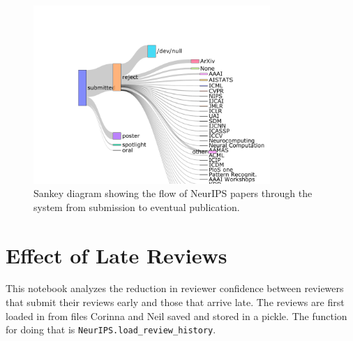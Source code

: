 \begin{figure}[htb]
\includegraphics[width=0.80\textwidth]{diagrams/neurips/where-do-neurips-papers-go.pdf}


\caption{Sankey diagram showing the flow of NeurIPS papers through the system from submission to eventual publication.}
\label{where-do-neurips-papers-go}
\end{figure}

\hypertarget{effect-of-late-reviews}{%
\section{Effect of Late Reviews}\label{effect-of-late-reviews}}

\begin{flushright}
\end{flushright}

This notebook analyzes the reduction in reviewer confidence between
reviewers that submit their reviews early and those that arrive late.
The reviews are first loaded in from files Corinna and Neil saved and
stored in a pickle. The function for doing that is
\texttt{NeurIPS.load\_review\_history}.

\begin{Shaded}
\begin{Highlighting}[]

\end{Highlighting}
\end{Shaded}

